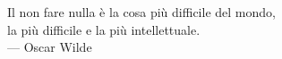 \cleardoublepage
{}
\thispagestyle{empty}

\vspace*{3cm}

\begin{center}
Il non fare nulla è la cosa più difficile del mondo,\\
la più difficile e la più intellettuale. \\ \medskip
--- Oscar Wilde    
\end{center}

